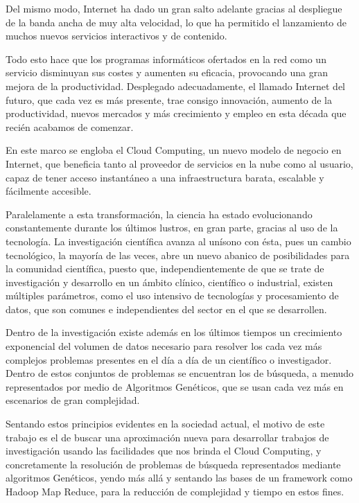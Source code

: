 \documentclass[runningheads]{llncs}
\begin{document}
Del mismo modo, Internet ha dado un gran salto adelante gracias al despliegue de la banda ancha de muy alta velocidad, lo que ha 
permitido el lanzamiento de muchos nuevos servicios interactivos y de contenido. 

Todo esto hace que los programas informáticos ofertados en la red como un servicio disminuyan sus costes y aumenten su eficacia, 
provocando una gran mejora de la productividad. Desplegado adecuadamente, el llamado Internet del futuro, que cada vez es más 
presente, trae consigo innovación, aumento de la productividad, nuevos mercados y más crecimiento y empleo en esta década que 
recién acabamos de comenzar. 

En este marco se engloba el Cloud Computing, un nuevo modelo de negocio en Internet, que beneficia tanto al proveedor de 
servicios en la nube como al usuario, capaz de tener acceso instantáneo a una infraestructura barata, escalable y fácilmente 
accesible. 
 
Paralelamente a esta transformación, la ciencia ha estado evolucionando constantemente durante los últimos lustros, en gran parte, 
gracias al uso  de la tecnología. La investigación científica avanza al unísono con ésta, pues un cambio tecnológico, la mayoría 
de las veces, abre un nuevo abanico de posibilidades para la comunidad científica, puesto que, independientemente de que se trate 
de investigación y desarrollo en un ámbito clínico, científico o industrial, existen múltiples parámetros, como el uso intensivo 
de tecnologías y procesamiento de datos, que son comunes e independientes del sector en el que se desarrollen. 

Dentro de la investigación existe además en los últimos tiempos un crecimiento exponencial del volumen de datos necesario para 
resolver los cada vez más complejos problemas presentes en el día a día de un científico o investigador. Dentro de estos conjuntos 
de problemas se encuentran los de búsqueda, a menudo representados por medio de Algoritmos Genéticos, que se usan cada vez más en 
escenarios de gran complejidad. 


Sentando estos principios evidentes en la sociedad actual, el motivo de este trabajo es el de buscar una aproximación nueva para 
desarrollar trabajos de investigación usando las facilidades que nos brinda el Cloud Computing, y concretamente la resolución de 
problemas de búsqueda representados mediante algoritmos Genéticos, yendo más allá y sentando las bases de un framework como 
Hadoop Map Reduce, para la reducción de complejidad y tiempo en estos fines.
\end{document}
